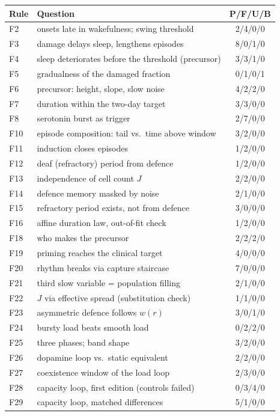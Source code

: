 \documentclass[11pt,a4paper]{article}
\theoremstyle{remark}
\begin{document}
\begin{center}\footnotesize
\begin{tabular}{@{}l p{} c@{}}
\toprule
Rule & Question & P/F/U/B\\
\midrule
F2 & onsets late in wakefulness; swing threshold & 2/4/0/0\\
F3 & damage delays sleep, lengthens episodes & 8/0/1/0\\
F4 & sleep deteriorates before the threshold (precursor) & 3/3/1/0\\
F5 & gradualness of the damaged fraction & 0/1/0/1\\
F6 & precursor: height, slope, slow noise & 4/2/2/0\\
F7 & duration within the two-day target & 3/3/0/0\\
F8 & serotonin burst as trigger & 2/7/0/0\\
F10 & episode composition: tail vs.\ time above window & 3/2/0/0\\
F11 & induction closes episodes & 1/2/0/0\\
F12 & deaf (refractory) period from defence & 1/2/0/0\\
F13 & independence of cell count $J$ & 2/2/0/0\\
F14 & defence memory masked by noise & 2/1/0/0\\
F15 & refractory period exists, not from defence & 3/0/0/0\\
F16 & affine duration law, out-of-fit check & 1/2/0/0\\
F18 & who makes the precursor & 2/2/2/0\\
F19 & priming reaches the clinical target & 4/0/0/0\\
F20 & rhythm breaks via capture staircase & 7/0/0/0\\
F21 & third slow variable = population filling & 2/1/0/0\\
F22 & $J$ via effective spread (substitution check) & 1/1/0/0\\
F23 & asymmetric defence follows $w(r)$ & 3/0/1/0\\
F24 & bursty load beats smooth load & 0/2/2/0\\
F25 & three phases; band shape & 3/2/0/0\\
F26 & dopamine loop vs.\ static equivalent & 2/2/0/0\\
F27 & coexistence window of the load loop & 2/3/0/0\\
F28 & capacity loop, first edition (controls failed) & 0/3/4/0\\
F29 & capacity loop, matched differences & 5/1/0/0\\
\bottomrule
\end{tabular}
\end{center}
\end{document}
